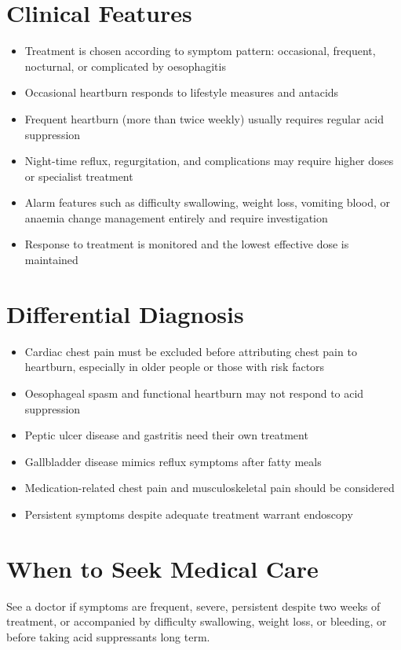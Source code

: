 \section*{Clinical Features}
\begin{itemize}
    \item Treatment is chosen according to symptom pattern: occasional, frequent, nocturnal, or complicated by oesophagitis
    \item Occasional heartburn responds to lifestyle measures and antacids
    \item Frequent heartburn (more than twice weekly) usually requires regular acid suppression
    \item Night-time reflux, regurgitation, and complications may require higher doses or specialist treatment
    \item Alarm features such as difficulty swallowing, weight loss, vomiting blood, or anaemia change management entirely and require investigation
    \item Response to treatment is monitored and the lowest effective dose is maintained
\end{itemize}

\section*{Differential Diagnosis}
\begin{itemize}
    \item Cardiac chest pain must be excluded before attributing chest pain to heartburn, especially in older people or those with risk factors
    \item Oesophageal spasm and functional heartburn may not respond to acid suppression
    \item Peptic ulcer disease and gastritis need their own treatment
    \item Gallbladder disease mimics reflux symptoms after fatty meals
    \item Medication-related chest pain and musculoskeletal pain should be considered
    \item Persistent symptoms despite adequate treatment warrant endoscopy
\end{itemize}

\section*{When to Seek Medical Care}
See a doctor if symptoms are frequent, severe, persistent despite two weeks of treatment, or accompanied by difficulty swallowing, weight loss, or bleeding, or before taking acid suppressants long term.

